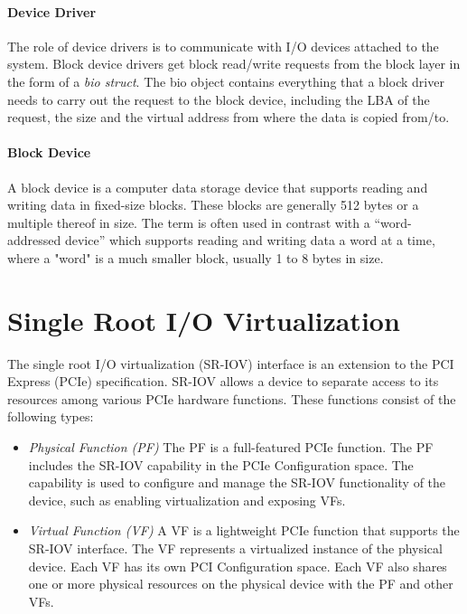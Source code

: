 \paragraph{Device Driver}
\label{iovirt:driver}
The role of device drivers is to communicate with I/O devices attached to the system.
Block device drivers get block read/write requests from the block layer in the form of a \emph{bio struct}. The bio object contains everything that a block driver needs to carry out the request to
the block device, including the LBA of the request, the size
and the virtual address from where the data is copied from/to.

\paragraph{Block Device}
A block device is a computer data storage device that supports reading and writing data in
fixed-size blocks. These blocks are generally 512 bytes or a multiple thereof in size. The term is often used in contrast with a ``word-addressed device'' which supports reading and
writing data a word at a time, where a "word" is a much smaller block, usually 1 to 8 bytes in size.

\section{Single Root I/O Virtualization}
\label{sec:sriov}
The single root I/O virtualization (SR-IOV) interface is an extension to the PCI Express (PCIe) specification.
SR-IOV allows a device to separate access to its resources among various PCIe hardware functions. These functions consist of the following types:

\begin{itemize}
\item \emph{Physical Function (PF)} \quad
  The PF is a full-featured PCIe function. The PF includes the SR-IOV capability in the PCIe Configuration space.
  The capability is used to configure and manage the SR-IOV functionality of the device, such as enabling
  virtualization and exposing VFs.
\item \emph{Virtual Function (VF)} \quad
  A VF is a lightweight PCIe function that supports the SR-IOV interface. The VF represents a virtualized instance of the physical device.
  Each VF has its own PCI Configuration space. Each VF also shares one or more physical
  resources on the physical device with the PF and other VFs.
\end{itemize}

